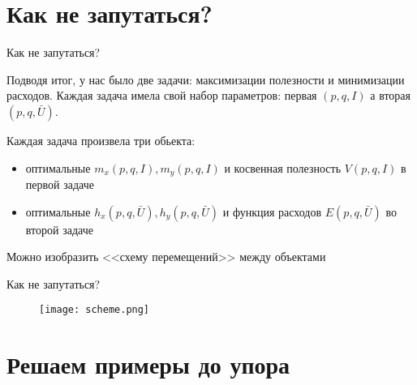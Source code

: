 \documentclass{beamer}
\begin{document}
\section{Как не запутаться?}

\begin{frame}{Как не запутаться?}

Подводя итог, у нас было две задачи: максимизации полезности и минимизации расходов. Каждая задача имела свой набор параметров: первая $(p,q,I)$ а вторая $(p,q,\bar U)$. 

Каждая задача произвела три обьекта:

\begin{itemize}
\item оптимальные $m_x(p,q,I), m_y(p,q,I)$ и косвенная полезность $V(p,q,I)$ в первой задаче
\item оптимальные $h_x(p,q,\bar U), h_y(p,q,\bar U)$ и функция расходов $E(p,q,\bar U)$ во второй задаче
\end{itemize}
Можно изобразить <<схему перемещений>> между объектами

\end{frame}

\begin{frame}{Как не запутаться?}

\begin{figure}[hbt]
\centering
\texttt{[image: scheme.png]}
\end{figure}

\end{frame}

\section{Решаем примеры до упора}
\end{document}
